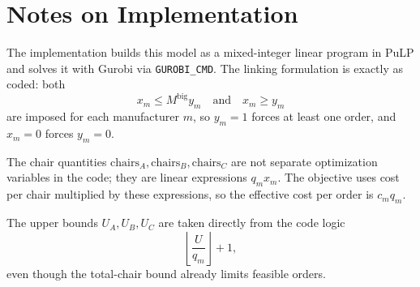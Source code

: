 \section*{Notes on Implementation}

The implementation builds this model as a mixed-integer linear program in PuLP and solves it with Gurobi via \texttt{GUROBI\_CMD}. The linking formulation is exactly as coded: both
\[
x_m \le M^{\text{big}} y_m
\quad\text{and}\quad
x_m \ge y_m
\]
are imposed for each manufacturer \(m\), so \(y_m=1\) forces at least one order, and \(x_m=0\) forces \(y_m=0\).

The chair quantities \(\text{chairs}_A,\text{chairs}_B,\text{chairs}_C\) are not separate optimization variables in the code; they are linear expressions \(q_m x_m\). The objective uses cost per chair multiplied by these expressions, so the effective cost per order is \(c_m q_m\).

The upper bounds \(U_A,U_B,U_C\) are taken directly from the code logic
\[
\left\lfloor \frac{U}{q_m} \right\rfloor + 1,
\]
even though the total-chair bound already limits feasible orders.
